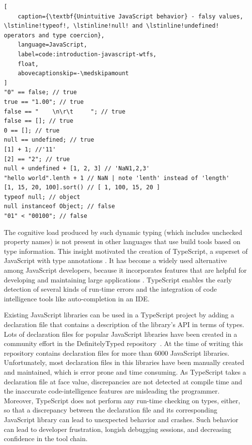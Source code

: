 \documentclass[english,cleveref,autoref,submission]{programming}
\begin{document}
\begin{lstlisting}[
    caption={\textbf{Unintuitive JavaScript behavior} - falsy values, \lstinline!typeof!, \lstinline!null! and \lstinline!undefined! operators and type coercion},
    language=JavaScript,
	label=code:introduction-javascript-wtfs,
    float,
    abovecaptionskip=-\medskipamount
]
"0" == false; // true
true == "1.00"; // true
false == "    \n\r\t     "; // true
false == []; // true
0 == []; // true
null == undefined; // true
[1] + 1; //'11'
[2] == "2"; // true
null + undefined + [1, 2, 3] // 'NaN1,2,3'
"hello world".lenth + 1 // NaN | note 'lenth' instead of 'length'
[1, 15, 20, 100].sort() // [ 1, 100, 15, 20 ]
typeof null; // object
null instanceof Object; // false
"01" < "00100"; // false
\end{lstlisting}

The cognitive load produced by such dynamic typing (which includes
unchecked property names) is not present in other languages that use
build tools based on type information. This insight motivated the
creation of TypeScript, a superset of JavaScript with type
annotations \cite{typescript}. It has become a widely used alternative
among JavaScript developers, because it incorporates features that are
helpful for developing and maintaining large applications
\cite{DBLP:conf/icse/GaoBB17}. TypeScript enables the early detection
of several kinds of run-time errors and the integration of code intelligence
tools like auto-completion in an IDE.

Existing JavaScript libraries can be used in a TypeScript project by
adding a declaration file that contains a description of the library's
API in terms of types. Lots of declaration files for popular
JavaScript libraries have been created in a community effort in the
DefinitelyTyped repository~\cite{definitely-typed-repository}.
At the time of writing this repository contains declaration files for
more than 6000 JavaScript libraries. Unfortunately, most declaration
files in this libraries have been manually created and maintained,
which is error prone and time consuming. As TypeScript takes a
declaration file at face value, discrepancies are not detected at
compile time and the inaccurate code-intelligence features are misleading the
programmer. Moreover, TypeScript does not perform any run-time 
checking on types, either, so that a discrepancy  between the declaration file
and its corresponding JavaScript library can lead to unexpected 
behavior and crashes. Such behavior can lead to developer
frustration, longish debugging sessions, and decreasing confidence in
the tool chain.
\end{document}
